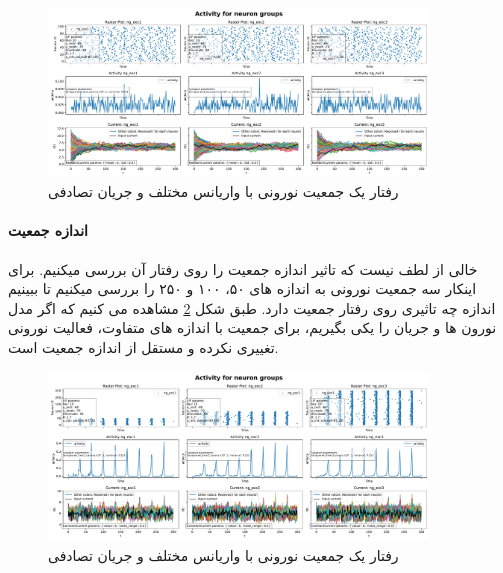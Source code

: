 \documentclass{report}
\begin{document}
                \begin{figure}[!ht]
                    \centering
                    \includegraphics[width=0.9\textwidth]{plots/part2-one-ng-full-synapse-diff-variance-rand-curr.pdf} 
                    \caption{رفتار یک جمعیت نورونی با واریانس مختلف و جریان تصادفی}
                    \label{fig:part2-one-ng-full-synapse-diff-variance-rand-curr}
                \end{figure}

            \paragraph*{اندازه جمعیت}
                خالی از لطف نیست که تاثیر اندازه جمعیت را روی رفتار آن بررسی میکنیم. برای اینکار سه جمعیت نورونی به اندازه های ۵۰، ۱۰۰ و ۲۵۰ را بررسی میکنیم تا ببینیم اندازه چه تاثیری روی رفتار جمعیت دارد. طبق شکل
                \ref{fig:part2-one-ng-full-synapse-diff-size}
                مشاهده می کنیم که اگر مدل نورون ها و جریان را یکی بگیریم، برای جمعیت با اندازه های متفاوت، فعالیت نورونی تغییری نکرده و مستقل از اندازه جمعیت است.
                \begin{figure}[!ht]
                    \centering
                    \includegraphics[width=0.9\textwidth]{plots/part2-one-ng-full-synapse-diff-size.pdf} 
                    \caption{رفتار یک جمعیت نورونی با واریانس مختلف و جریان تصادفی}
                    \label{fig:part2-one-ng-full-synapse-diff-size}
                \end{figure}
\end{document}
